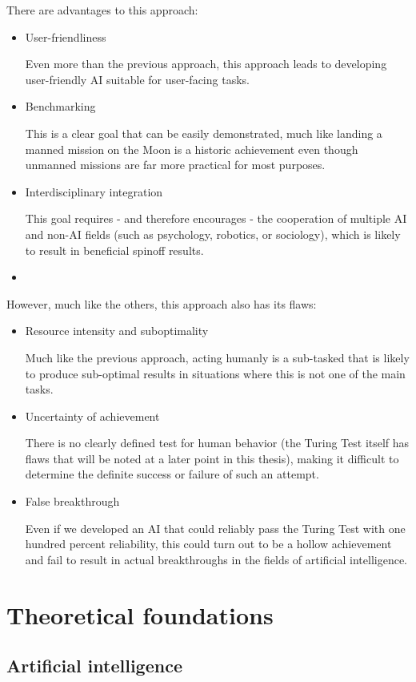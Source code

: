 \documentclass[masterthesis]{fer}
\begin{document}
There are advantages to this approach:
\begin{itemize}
\item{User-friendliness}

Even more than the previous approach, this approach leads to developing user-friendly AI suitable for user-facing tasks.
\item{Benchmarking}

This is a clear goal that can be easily demonstrated, much like landing a manned mission on the Moon is a historic achievement even though unmanned missions are far more practical for most purposes.
\item{Interdisciplinary integration}

This goal requires - and therefore encourages - the cooperation of multiple AI and non-AI fields (such as psychology, robotics, or sociology), which is likely to result in beneficial spinoff results.
\item
\end{itemize}
However, much like the others, this approach also has its flaws:
\begin{itemize}
\item{Resource intensity and suboptimality}

Much like the previous approach, acting humanly is a sub-tasked that is likely to produce sub-optimal results in situations where this is not one of the main tasks.
\item{Uncertainty of achievement}

There is no clearly defined test for human behavior (the Turing Test itself has flaws that will be noted at a later point in this thesis), making it difficult to determine the definite success or failure of such an attempt.
\item{False breakthrough}

Even if we developed an AI that could reliably pass the Turing Test with one hundred percent reliability, this could turn out to be a hollow achievement and fail to result in actual breakthroughs in the fields of artificial intelligence.
\end{itemize}
\chapter{Theoretical foundations}
\section{Artificial intelligence}
\end{document}

